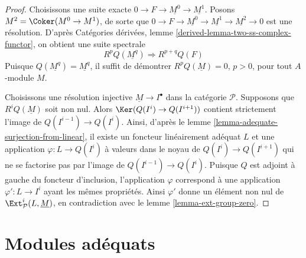 \begin{proof}
Choisissons une suite exacte $0 \to F \to \underline{M^0} \to \underline{M^1}$.
Posons $M^2 = \Coker(M^0 \to M^1)$, de sorte que
$0 \to F \to \underline{M^0} \to \underline{M^1}
\to \underline{M^2} \to 0$ est une résolution. D'après
Catégories dérivées, lemme \ref{derived-lemma-two-ss-complex-functor},
on obtient une suite spectrale
$$
R^pQ(\underline{M^q}) \Rightarrow R^{p + q}Q(F)
$$
Puisque $Q(\underline{M^q}) = \underline{M^q}$, il suffit de démontrer
$R^pQ(\underline{M}) = 0$, $p > 0$, pour tout $A$-module $M$.

\medskip\noindent
Choisissons une résolution injective $\underline{M} \to I^\bullet$ dans
la catégorie $\mathcal{P}$. Supposons que $R^iQ(\underline{M})$ soit non nul.
Alors $\Ker(Q(I^i) \to Q(I^{i + 1}))$ contient strictement
l'image de $Q(I^{i - 1}) \to Q(I^i)$. Ainsi, d'après le
lemme \ref{lemma-adequate-surjection-from-linear},
il existe un foncteur linéairement adéquat $L$ et une application
$\varphi : L \to Q(I^i)$ à valeurs dans le noyau de $Q(I^i) \to Q(I^{i + 1})$
qui ne se factorise pas par l'image de $Q(I^{i - 1}) \to Q(I^i)$.
Puisque $Q$ est adjoint à gauche du foncteur d'inclusion, l'application
$\varphi$ correspond à une application $\varphi' : L \to I^i$ ayant les mêmes propriétés.
Ainsi $\varphi'$ donne un élément non nul de
$\Ext^i_\mathcal{P}(L, \underline{M})$, en contradiction avec le
lemme \ref{lemma-ext-group-zero}.
\end{proof}














\section{Modules adéquats}
\label{section-adequate}

